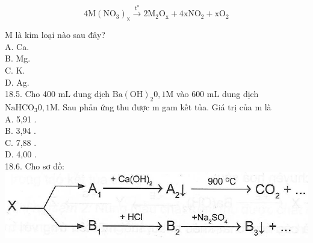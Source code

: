 \documentclass[10pt]{article}
\begin{document}
$$
4 \mathrm{M}\left(\mathrm{NO}_{3}\right)_{\mathrm{x}} \xrightarrow{\mathrm{t}^{\mathrm{o}}} 2 \mathrm{M}_{2} \mathrm{O}_{\mathrm{x}}+4 \mathrm{xNO}_{2}+\mathrm{xO}_{2}
$$

M là kim loại nào sau đây?\\
A. Ca.\\
B. Mg.\\
C. K.\\
D. Ag.\\
18.5. Cho 400 mL dung dịch $\mathrm{Ba}(\mathrm{OH})_{2} 0,1 \mathrm{M}$ vào 600 mL dung dịch $\mathrm{NaHCO}_{3} 0,1 \mathrm{M}$. Sau phản ứng thu được m gam kết tủa. Giá trị của m là\\
A. 5,91 .\\
B. 3,94 .\\
C. 7,88 .\\
D. 4,00 .\\
18.6. Cho sơ đồ:\\
\includegraphics[max width=\textwidth, center]{2025_10_23_de6f5713836e4e91b3c8g-109}
\end{document}
